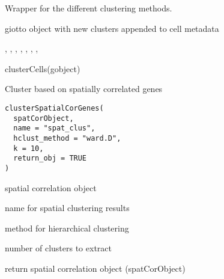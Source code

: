 \documentclass[a4paper]{book}
\begin{document}
%
\begin{Details}\relax
Wrapper for the different clustering methods.
\end{Details}
%
\begin{Value}
giotto object with new clusters appended to cell metadata
\end{Value}
%
\begin{SeeAlso}\relax
{}, , ,
, , ,
, 
\end{SeeAlso}
%
\begin{Examples}
\begin{ExampleCode}
    clusterCells(gobject)
\end{ExampleCode}
\end{Examples}
%
\begin{Description}\relax
Cluster based on spatially correlated genes
\end{Description}
%
\begin{Usage}
\begin{verbatim}
clusterSpatialCorGenes(
  spatCorObject,
  name = "spat_clus",
  hclust_method = "ward.D",
  k = 10,
  return_obj = TRUE
)
\end{verbatim}
\end{Usage}
%
\begin{Arguments}
\begin{ldescription}
\item[\code{spatCorObject}] spatial correlation object

\item[\code{name}] name for spatial clustering results

\item[\code{hclust\_method}] method for hierarchical clustering

\item[\code{k}] number of clusters to extract

\item[\code{return\_obj}] return spatial correlation object (spatCorObject)
\end{ldescription}
\end{Arguments}
\end{document}
